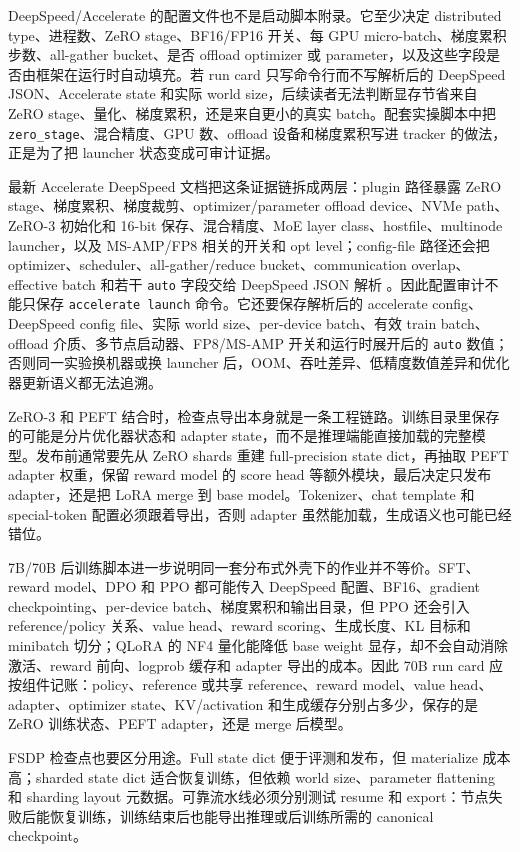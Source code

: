 \documentclass[UTF8,zihao=-4,openany]{ctexbook}
\begin{document}
DeepSpeed/Accelerate 的配置文件也不是启动脚本附录。它至少决定 distributed type、进程数、ZeRO stage、BF16/FP16 开关、每 GPU micro-batch、梯度累积步数、all-gather bucket、是否 offload optimizer 或 parameter，以及这些字段是否由框架在运行时自动填充。若 run card 只写命令行而不写解析后的 DeepSpeed JSON、Accelerate state 和实际 world size，后续读者无法判断显存节省来自 ZeRO stage、量化、梯度累积，还是来自更小的真实 batch。配套实操脚本中把 \texttt{zero\_stage}、混合精度、GPU 数、offload 设备和梯度累积写进 tracker 的做法，正是为了把 launcher 状态变成可审计证据。

最新 Accelerate DeepSpeed 文档把这条证据链拆成两层：plugin 路径暴露 ZeRO stage、梯度累积、梯度裁剪、optimizer/parameter offload device、NVMe path、ZeRO-3 初始化和 16-bit 保存、混合精度、MoE layer class、hostfile、multinode launcher，以及 MS-AMP/FP8 相关的开关和 opt level；config-file 路径还会把 optimizer、scheduler、all-gather/reduce bucket、communication overlap、effective batch 和若干 \texttt{auto} 字段交给 DeepSpeed JSON 解析 \cite{huggingface2026acceleratedeepspeed}。因此配置审计不能只保存 \texttt{accelerate launch} 命令。它还要保存解析后的 accelerate config、DeepSpeed config file、实际 world size、per-device batch、有效 train batch、offload 介质、多节点启动器、FP8/MS-AMP 开关和运行时展开后的 \texttt{auto} 数值；否则同一实验换机器或换 launcher 后，OOM、吞吐差异、低精度数值差异和优化器更新语义都无法追溯。

ZeRO-3 和 PEFT 结合时，检查点导出本身就是一条工程链路。训练目录里保存的可能是分片优化器状态和 adapter state，而不是推理端能直接加载的完整模型。发布前通常要先从 ZeRO shards 重建 full-precision state dict，再抽取 PEFT adapter 权重，保留 reward model 的 score head 等额外模块，最后决定只发布 adapter，还是把 LoRA merge 到 base model。Tokenizer、chat template 和 special-token 配置必须跟着导出，否则 adapter 虽然能加载，生成语义也可能已经错位。

7B/70B 后训练脚本进一步说明同一套分布式外壳下的作业并不等价。SFT、reward model、DPO 和 PPO 都可能传入 DeepSpeed 配置、BF16、gradient checkpointing、per-device batch、梯度累积和输出目录，但 PPO 还会引入 reference/policy 关系、value head、reward scoring、生成长度、KL 目标和 minibatch 切分；QLoRA 的 NF4 量化能降低 base weight 显存，却不会自动消除激活、reward 前向、logprob 缓存和 adapter 导出的成本。因此 70B run card 应按组件记账：policy、reference 或共享 reference、reward model、value head、adapter、optimizer state、KV/activation 和生成缓存分别占多少，保存的是 ZeRO 训练状态、PEFT adapter，还是 merge 后模型。

FSDP 检查点也要区分用途。Full state dict 便于评测和发布，但 materialize 成本高；sharded state dict 适合恢复训练，但依赖 world size、parameter flattening 和 sharding layout 元数据。可靠流水线必须分别测试 resume 和 export：节点失败后能恢复训练，训练结束后也能导出推理或后训练所需的 canonical checkpoint。
\end{document}
